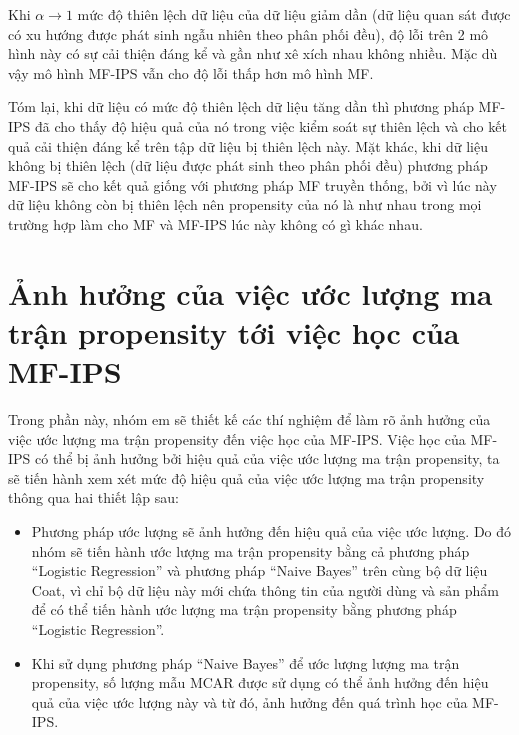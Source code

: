 Khi $\alpha \rightarrow 1$ mức độ thiên lệch dữ liệu của dữ liệu giảm dần (dữ liệu quan sát được có xu hướng được phát sinh ngẫu nhiên theo phân phối đều), độ lỗi trên 2 mô hình này có sự cải thiện đáng kể và gần như xê xích nhau không nhiều. Mặc dù vậy mô hình MF-IPS vẫn cho độ lỗi thấp hơn mô hình MF. 

Tóm lại, khi dữ liệu có mức độ thiên lệch dữ liệu tăng dần thì phương pháp MF-IPS đã cho thấy độ hiệu quả của nó trong việc kiểm soát sự thiên lệch và cho kết quả cải thiện đáng kể trên tập dữ liệu bị thiên lệch này. Mặt khác, khi dữ liệu không bị thiên lệch (dữ liệu được phát sinh theo phân phối đều) phương pháp MF-IPS sẽ cho kết quả giống với phương pháp MF truyền thống, bởi vì lúc này dữ liệu không còn bị thiên lệch nên propensity của nó là như nhau trong mọi trường hợp làm cho MF và MF-IPS lúc này không có gì khác nhau.

\section{Ảnh hưởng của việc ước lượng ma trận propensity tới việc học của MF-IPS}
Trong phần này, nhóm em sẽ thiết kế các thí nghiệm để làm rõ ảnh hưởng của việc ước lượng ma trận propensity đến việc học của MF-IPS. Việc học của MF-IPS có thể bị ảnh hưởng bởi hiệu quả của việc ước lượng ma trận propensity, ta sẽ tiến hành xem xét mức độ hiệu quả của việc ước lượng ma trận propensity thông qua hai thiết lập sau:
\begin{itemize}
    \item Phương pháp ước lượng sẽ ảnh hưởng đến hiệu quả của việc ước lượng. Do đó nhóm sẽ tiến hành ước lượng ma trận propensity bằng cả phương pháp ``Logistic Regression'' và phương pháp ``Naive Bayes'' trên cùng bộ dữ liệu Coat, vì chỉ bộ dữ liệu này mới chứa thông tin của người dùng và sản phẩm để có thể tiến hành ước lượng ma trận propensity bằng phương pháp ``Logistic Regression''. 
    \item Khi sử dụng phương pháp ``Naive Bayes'' để ước lượng lượng ma trận propensity, số lượng mẫu MCAR được sử dụng có thể ảnh hưởng đến hiệu quả của việc ước lượng này và từ đó, ảnh hưởng đến quá trình học của MF-IPS.
\end{itemize}

